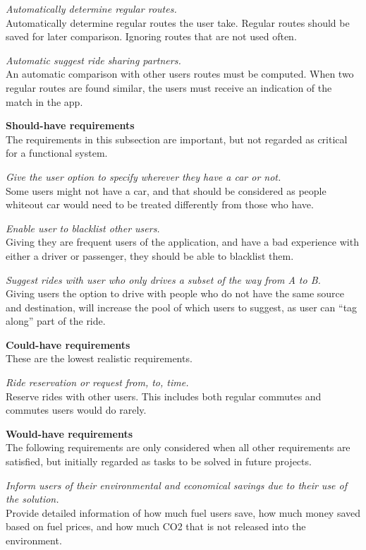 \textit{Automatically determine regular routes.}\\
Automatically determine regular routes the user take. 
Regular routes should be saved for later comparison. 
Ignoring routes that are not used often.

\textit{Automatic suggest ride sharing partners.}\\
An automatic comparison with other users routes must be computed.
When two regular routes are found similar, the users must receive an indication of the match in the app.


\textbf{Should-have requirements}\\
The requirements in this subsection are important, but not regarded as critical for a functional system.

\textit{Give the user option to specify wherever they have a car or not.}\\
Some users might not have a car, and that should be considered as people whiteout car would need to be treated differently from those who have.

\textit{Enable user to blacklist other users.}\\
Giving they are frequent users of the application, and have a bad experience with either a driver or passenger, they should be able to blacklist them.

\textit{Suggest rides with user who only drives a subset of the way from A to B.}\\
Giving users the option to drive with people who do not have the same source and destination, will increase the pool of which users to suggest, as user can ``tag along'' part of the ride.


\textbf{Could-have requirements}\\
These are the lowest realistic requirements. 

\textit{Ride reservation or request from, to, time.}\\
Reserve rides with other users. 
This includes both regular commutes and commutes users would do rarely.

\textbf{Would-have requirements}\\
The following requirements are only considered when all other requirements are satisfied, but initially regarded as tasks to be solved in future projects.

\textit{Inform users of their environmental and economical savings due to their use of the solution.}\\
Provide detailed information of how much fuel users save, how much money saved based on fuel prices, and how much CO2 that is not released into the environment. 

